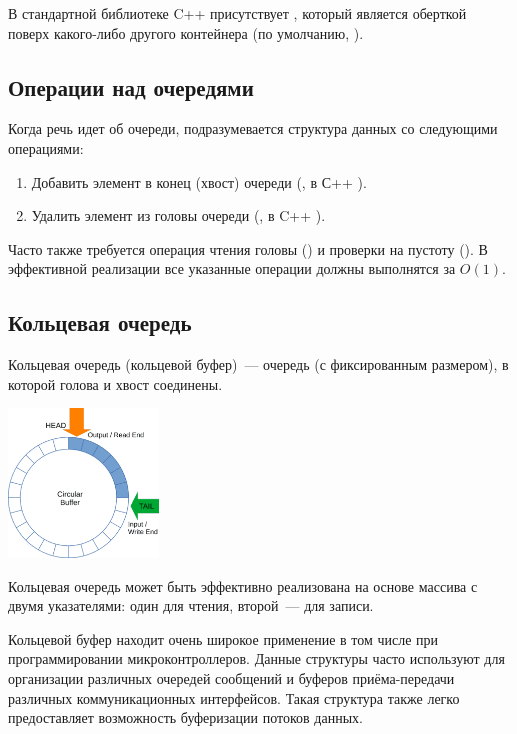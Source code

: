 В стандартной библиотеке C++ присутствует  , который является оберткой поверх
какого-либо другого контейнера (по умолчанию, ).

\subsection{Операции над очередями}
Когда речь идет об очереди, подразумевается структура данных со следующими операциями:
\begin{enumerate}
  \item Добавить элемент в конец (хвост) очереди (, в С++ ).
  \item Удалить элемент из головы очереди (, в C++ ).
\end{enumerate}
%
Часто также требуется операция чтения головы () и проверки на пустоту (). В эффективной реализации
все указанные операции должны выполнятся за \(O(1)\).

\subsection{Кольцевая очередь}
Кольцевая очередь (кольцевой буфер)~--- очередь (с фиксированным размером), в которой голова и хвост соединены.

\begin{center}
  \includegraphics[width=0.3\textwidth]{resources/19-26/ring.png}
\end{center}

Кольцевая очередь может быть эффективно реализована на основе массива с двумя указателями: один для чтения, второй~--- для записи.

Кольцевой буфер находит очень широкое применение в том числе при программировании микроконтроллеров.
Данные структуры часто используют для организации различных очередей сообщений и буферов приёма-передачи различных
коммуникационных интерфейсов. Такая структура также легко предоставляет возможность буферизации потоков данных.

